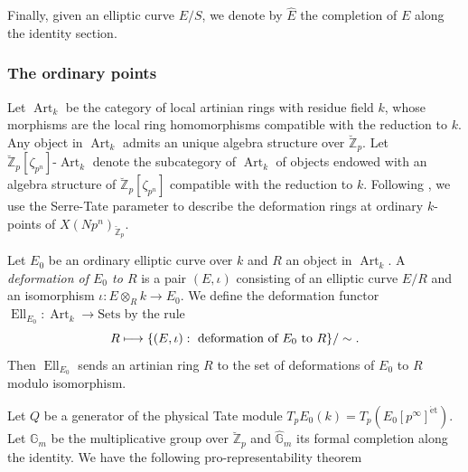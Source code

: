 \documentclass[11pt]{article}
\newcommand\mto{\mathchoice{\longmapsto}{\mapsto}{\mapsto}{\mapsto}}
\newcommand{\et}{\mathrm{\acute{e}t}}
\numberwithin{equation}{section}
\theoremstyle{definition}
\newcommand{\bb}[1]{\mathbb{#1}}
\DeclareMathOperator{\Ell}{Ell}
\DeclareMathOperator{\Art}{Art}
\begin{document}
Finally, given an elliptic curve $E/S$, we denote by $\widehat{E}$ the completion of $E$ along the identity section.

\subsubsection*{The ordinary points}

Let $\Art_k$ be the category of local artinian rings with residue field $k$, whose morphisms are the local ring homomorphisms compatible with the reduction to $k$. Any object in $\Art_k$ admits an unique algebra structure over $\breve{\bb{Z}}_p$. Let $\breve{\bb{Z}}_p[\zeta_{p^n}]\mbox{-}\Art_k$ denote the subcategory of $\Art_k$ of objects endowed with an algebra structure of $\breve{\bb{Z}}_p[\zeta_{p^n}]$ compatible with the reduction to $k$. Following \cite{katz1981serre}, we use the Serre-Tate parameter to describe the deformation rings at ordinary $k$-points of $X(Np^n)_{\breve{\bb{Z}}_p}$.

Let $E_0$ be an ordinary elliptic curve over $k$ and $R$ an object in $\Art_k$. A \textit{deformation of $E_0$ to $R$} is a pair $(E,\iota)$ consisting of an elliptic curve $E/R$ and an isomorphism $\iota:E\otimes_R k\to E_0$. We define the deformation functor $\Ell_{E_0}: \Art_k \to \mbox{Sets}$ by the rule\vspace*{-3pt}
\[
R \mto \{(E,\iota): \mbox{ deformation of $E_0$ to $R$}\}/\sim.
\]
Then $\Ell_{E_0}$ sends an artinian ring $R$ to the set of deformations of $E_0$ to $R$ modulo isomorphism.

Let $Q$ be a generator of the physical Tate module $T_pE_0(k)=T_p (E_0[p^\infty]^{\et})$. Let $\bb{G}_m$ be the multiplicative group over $\breve{\bb{Z}}_p$ and $\widehat{\bb{G}}_m$ its formal completion along the identity. We have the following pro-representability theorem
\end{document}
